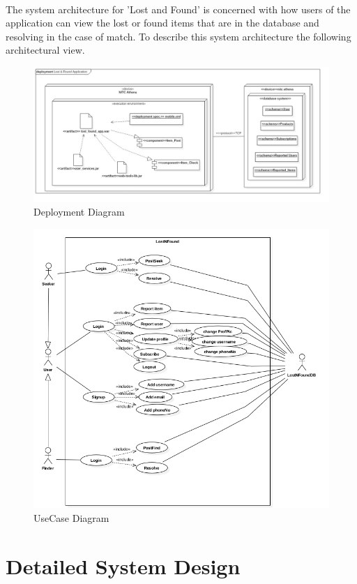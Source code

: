 \documentclass[a4paper,12pt]{article}
\begin{document}
\paragraph{}
The system architecture for 'Lost and Found' is concerned with how users of the application can view the lost or found items that are in the database and resolving in the case of match. To describe this system architecture the following architectural view.
\newpage
\begin{figure}[h!]
  \includegraphics[width=1\textwidth]{deployment}
  \caption{Deployment Diagram}
\end{figure}
\begin{figure}[h!]
  \includegraphics[width=1\textwidth]{use}
  \caption{UseCase Diagram}
\end{figure}
\section{Detailed System Design}
\end{document}
